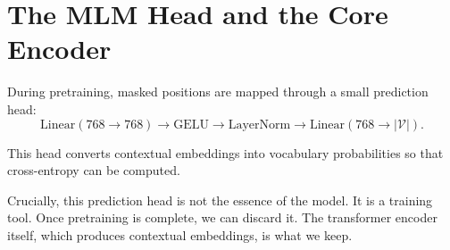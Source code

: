 \section{The MLM Head and the Core Encoder}
\medskip

During pretraining, masked positions are mapped through a small prediction head:
\[
\text{Linear}(768 \rightarrow 768)
\rightarrow
\text{GELU}
\rightarrow
\text{LayerNorm}
\rightarrow
\text{Linear}(768 \rightarrow |\mathcal{V}|).
\]

This head converts contextual embeddings into vocabulary probabilities so that cross-entropy can be computed.

Crucially, this prediction head is not the essence of the model. It is a training tool. Once pretraining is complete, we can discard it. The transformer encoder itself, which produces contextual embeddings, is what we keep.

\bigskip

